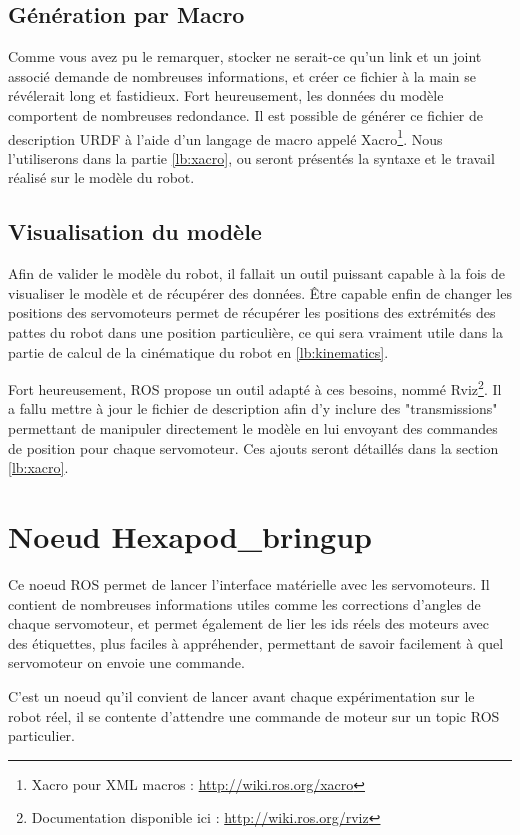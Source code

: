 \documentclass{tnreport}
\begin{document}
\subsection{Génération par Macro}
\label{lb:xacroprez}
Comme vous avez pu le remarquer, stocker ne serait-ce qu'un link et un joint associé demande de nombreuses informations, et créer ce fichier à la main se révélerait long et fastidieux. Fort heureusement, les données du modèle comportent de nombreuses redondance. Il est possible de générer ce fichier de description URDF à l'aide d'un langage de macro appelé Xacro\footnote{Xacro pour XML macros : \url{http://wiki.ros.org/xacro}}. Nous l'utiliserons dans la partie \ref{lb:xacro}, ou seront présentés la syntaxe et le travail réalisé sur le modèle du robot.   

\newpage
\subsection{Visualisation du modèle}
Afin de valider le modèle du robot, il fallait un outil puissant capable à la fois de visualiser le modèle et de récupérer des données. Être capable enfin de changer les positions des \gls{servomoteur}s permet de récupérer les positions des extrémités des pattes du robot dans une position particulière, ce qui sera vraiment utile dans la partie de calcul de la cinématique du robot en \ref{lb:kinematics}.

Fort heureusement, ROS propose un outil adapté à ces besoins, nommé Rviz\footnote{Documentation disponible ici : \url{http://wiki.ros.org/rviz}}. Il a fallu mettre à jour le fichier de description afin d'y inclure des "transmissions" permettant de manipuler directement le modèle en lui envoyant des commandes de position pour chaque \gls{servomoteur}. Ces ajouts seront détaillés dans la section \ref{lb:xacro}.

\section{Noeud Hexapod\_bringup}
Ce noeud ROS permet de lancer l'interface matérielle avec les \gls{servomoteur}s. Il contient de nombreuses informations utiles comme les corrections d'angles de chaque \gls{servomoteur}, et permet également de lier les ids réels des moteurs avec des étiquettes, plus faciles à appréhender, permettant de savoir facilement à quel \gls{servomoteur} on envoie une commande. 

C'est un noeud qu'il convient de lancer avant chaque expérimentation sur le robot réel, il se contente d'attendre une commande de moteur sur un topic \gls{ROS} particulier. 
\end{document}
